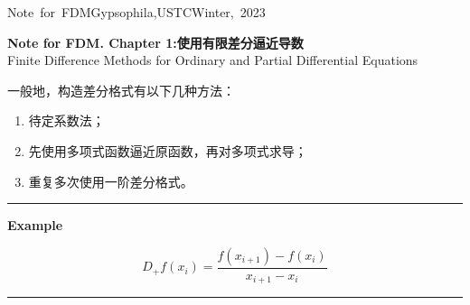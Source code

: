 \documentclass[a4paper,10pt]{ctexart}
\begin{document}
\hfill\vbox{\hbox{Note for FDM}\hbox{Gypsophila,USTC}\hbox{Winter, 2023}}

\begin{center}\Large
    \textbf{Note for FDM. Chapter 1:使用有限差分逼近导数}\\{\small Finite Difference Methods for Ordinary and Partial Differential Equations}
\end{center}

一般地，构造差分格式有以下几种方法：
\begin{enumerate}
    \item 待定系数法；
    \item 先使用多项式函数逼近原函数，再对多项式求导；
    \item 重复多次使用一阶差分格式。
\end{enumerate}

\hrule

\begin{center}\large
    \textbf{Example}
\end{center}

\begin{equation}
    D_+ f(x_i) = \frac{f(x_{i+1}) - f(x_i)}{x_{i+1} - x_i}
\end{equation}

\hrule
\end{document}

